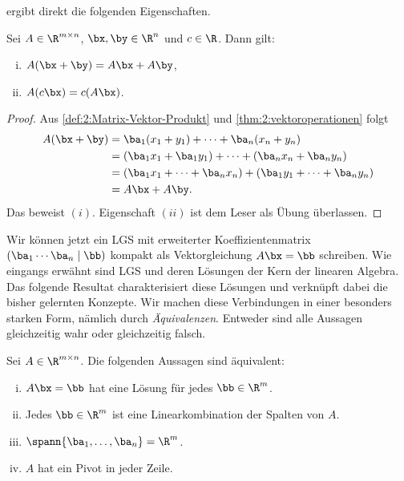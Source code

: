  ergibt direkt die folgenden Eigenschaften.


\begin{theorem} \label{thm:1:rechenregeln}
	Sei $A \in \R^{m \times n}$, $\bx, \by \in \R^n$ und $c \in \R$. Dann gilt:
	\begin{enumerate}[(i)]
		\item $A(\bx + \by) = A\bx + A\by$,
		\item $A(c\bx) = c(A\bx)$.
	\end{enumerate}
\end{theorem}

\begin{proof}
	Aus \cref{def:2:Matrix-Vektor-Produkt} und \cref{thm:2:vektoroperationen} folgt
	\begin{align*}
		A(\bx + \by) & = \ba_1 (x_1 + y_1) + \cdots + \ba_n (x_n + y_n)                        \\
		             & = (\ba_1 x_1 + \ba_1 y_1) + \cdots + (\ba_n x_n + \ba_n y_n)            \\
		             & = (\ba_1 x_1 + \cdots +  \ba_n x_n)  + (\ba_1 y_1 + \cdots + \ba_n y_n) \\
		             & = A\bx + A\by.
	\end{align*}
	Das beweist $(i)$. Eigenschaft $(ii)$ ist dem Leser als Übung überlassen.
\end{proof}


Wir können jetzt ein LGS mit erweiterter Koeffizientenmatrix $(\ba_1 \cdots \ba_n \mid \bb)$ kompakt als Vektorgleichung $A\bx = \bb$ schreiben. Wie eingangs erwähnt sind LGS und deren Lösungen der Kern der linearen Algebra. Das folgende Resultat charakterisiert diese Lösungen und verknüpft dabei die bisher gelernten Konzepte. Wir machen diese Verbindungen in einer besonders starken Form, nämlich durch \emph{Äquivalenzen}. Entweder sind alle Aussagen gleichzeitig wahr oder gleichzeitig falsch. 

\begin{theorem} \label{thm:2:equiv}
	Sei $A \in \R^{m \times n}$. Die folgenden Aussagen sind äquivalent:
	\begin{enumerate}[(i)]
		\item $A \bx = \bb$ hat eine Lösung für jedes $\bb \in \R^m$.
		\item Jedes $\bb \in \R^m$ ist eine Linearkombination der Spalten von $A$.
		\item $\spann\{\ba_1, \dots, \ba_n\} = \R^m$.
		\item $A$ hat ein Pivot in jeder Zeile.
	\end{enumerate}
\end{theorem}

